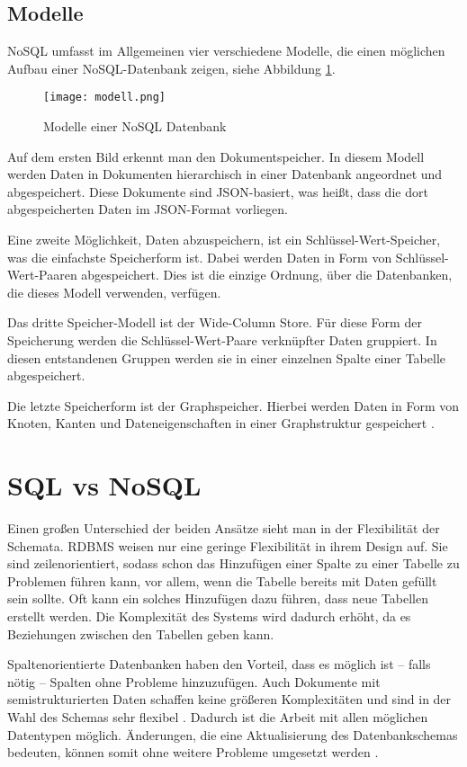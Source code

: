 \subsection{Modelle}

NoSQL umfasst im Allgemeinen vier verschiedene Modelle, die einen möglichen Aufbau einer NoSQL-Datenbank zeigen, siehe Abbildung \ref*{img:modell}.

\begin{figure}
    \centering
    \texttt{[image: modell.png]}
    \label{img:modell}
    \caption{Modelle einer NoSQL Datenbank  \cite{drei}}
\end{figure}

Auf dem ersten Bild erkennt man den Dokumentspeicher. In diesem Modell werden Daten in Dokumenten hierarchisch in einer Datenbank angeordnet und abgespeichert. Diese Dokumente sind JSON-basiert, was heißt, dass die dort abgespeicherten Daten im JSON-Format vorliegen.

Eine zweite Möglichkeit, Daten abzuspeichern, ist ein Schlüssel-Wert-Speicher, was die einfachste Speicherform ist. Dabei werden Daten in Form von Schlüssel-Wert-Paaren abgespeichert. Dies ist die einzige Ordnung, über die Datenbanken, die dieses Modell verwenden, verfügen.

Das dritte Speicher-Modell ist der Wide-Column Store. Für diese Form der Speicherung werden die Schlüssel-Wert-Paare verknüpfter Daten gruppiert. In diesen entstandenen Gruppen werden sie in einer einzelnen Spalte einer Tabelle abgespeichert.

Die letzte Speicherform ist der Graphspeicher. Hierbei werden Daten in Form von Knoten, Kanten und Dateneigenschaften in einer Graphstruktur gespeichert \cite{drei}.


\section{SQL vs NoSQL}

Einen großen Unterschied der beiden Ansätze sieht man in der Flexibilität der Schemata. RDBMS weisen nur eine geringe Flexibilität in ihrem Design auf. Sie sind zeilenorientiert, sodass schon das Hinzufügen einer Spalte zu einer Tabelle zu Problemen führen kann, vor allem, wenn die Tabelle bereits mit Daten gefüllt sein sollte. Oft kann ein solches Hinzufügen dazu führen, dass neue Tabellen erstellt werden. Die Komplexität des Systems wird dadurch erhöht, da es Beziehungen zwischen den Tabellen geben kann.

Spaltenorientierte Datenbanken haben den Vorteil, dass es möglich ist – falls nötig – Spalten ohne Probleme hinzuzufügen. Auch Dokumente mit semistrukturierten Daten schaffen keine größeren Komplexitäten und sind in der Wahl des Schemas sehr flexibel \cite[S.19]{zwei}. Dadurch ist die Arbeit mit allen möglichen Datentypen möglich. Änderungen, die eine Aktualisierung des Datenbankschemas bedeuten, können somit ohne weitere Probleme umgesetzt werden \cite[S.18]{zwei}. 


